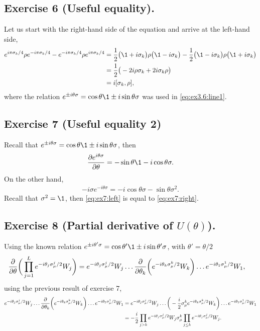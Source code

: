 \subsection{Exercise 6 (Useful equality).}\noindent
Let us start with the right-hand side of the equation and arrive at the left-hand side,
\begin{subequations}
\begin{align}
\label{eq:ex3.6:line1}
e^{i\pi \sigma_k/4}\rho e^{-i\pi \sigma_k/4}-
	e^{-i\pi \sigma_k/4}\rho e^{i\pi \sigma_k/4}&=
		\frac{1}{2}\big(\1+i\sigma_k \big)\rho\big(\1-i\sigma_k \big)-
			\frac{1}{2}\big(\1-i\sigma_k \big)\rho\big(\1+i\sigma_k \big)\\
&=\frac{1}{2}\big( -2i\rho\sigma_k+2i\sigma_k\rho \big)\\
&=i\comm{\sigma_k}{\rho},
\end{align}
\end{subequations}
where the relation $e^{\pm i\theta\sigma}=\cos \theta\1\pm i\sin\theta\sigma$
was used in \eqref{eq:ex3.6:line1}.

\subsection{Exercise 7 (Useful equality 2)}\noindent
Recall that $e^{\pm i\theta\sigma}=\cos \theta\1\pm i\sin\theta\sigma$, then 
\begin{align}\label{eq:ex7:left}
\pdv{e^{i\theta\sigma}}{\theta}=-\sin\theta\1-i\cos\theta\sigma.
\end{align}
On the other hand, 
\begin{align}\label{eq:ex7:right}
-i\sigma e^{-i\theta\sigma}=-i\cos\theta\sigma-\sin\theta\sigma^2.
\end{align}
Recall that $\sigma^2=\1$, then \eqref{eq:ex7:left} is equal to \eqref{eq:ex7:right}.

\subsection{Exercise 8 (Partial derivative of $U(\theta)$).}
Using the known relation $e^{\pm i\theta'\sigma}=\cos \theta'\1\pm i\sin\theta'\sigma$,
with $\theta'=\theta/2$
\begin{align}
\pdv{\theta}\bigg( \prod_{j=1}^Le^{-i\theta_j\sigma_{\mu}^j/2}W_j \bigg)&=
	e^{-i\theta_j\sigma_{\mu}^j/2}W_j\ldots 
		\pdv{\theta_k}\bigg( e^{-i\theta_k\sigma_{\mu}^k/2}W_k \bigg)
		\ldots e^{-i\theta_1\sigma_{\mu}^1/2}W_1,
\end{align}
using the previous result of exercise 7,
\begin{subequations}
\begin{align}
e^{-i\theta_j\sigma_{\mu}^j/2}W_j\ldots 
	\pdv{\theta_k}\bigg( e^{-i\theta_k\sigma_{\mu}^k/2}W_k \bigg)
		\ldots e^{-i\theta_1\sigma_{\mu}^1/2}W_1&=
			e^{-i\theta_j\sigma_{\mu}^j/2}W_j\ldots 
				\bigg( -\frac{i}{2}\sigma_{\mu}^ke^{-i\theta_k\sigma_{\mu}^k/2}W_k \bigg)
					\ldots e^{-i\theta_1\sigma_{\mu}^1/2}W_1\\
&=-\frac{i}{2}\prod_{j>k}e^{-i\theta_j\sigma_{\mu}^j/2}W_j\sigma_{\mu}^k
	\prod_{j\le k}e^{-i\theta_j\sigma_{\mu}^j/2}W_j.
\end{align}
\end{subequations}

